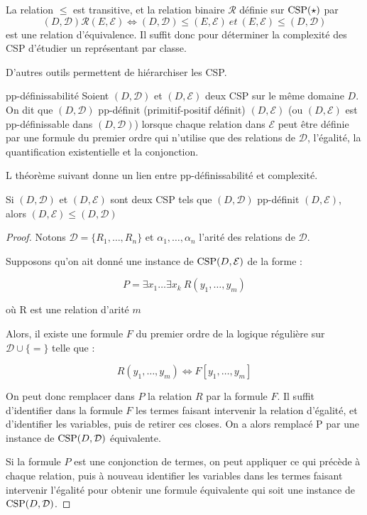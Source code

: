 \begin{prop}
La relation $\leq$ est transitive, et la relation binaire $\mathcal{R}$ définie sur $\text{CSP} (\star)$ par 
$$(D,\mathcal{D}) \mathcal{R} (E,\mathcal{E}) \iff (D,\mathcal{D}) \leq (E,\mathcal{E}) \ et \ (E,\mathcal{E}) \leq (D,\mathcal{D})$$
est une relation d'équivalence. Il suffit donc pour déterminer la complexité des CSP d'étudier un représentant par classe.
\end{prop}

D'autres outils permettent de hiérarchiser les CSP.

\begin{defi}{pp-définissabilité}
Soient $(D,\mathcal{D})$ et $(D,\mathcal{E})$ deux CSP sur le même domaine $D$. On dit que $(D,\mathcal{D})$ pp-définit (primitif-positif définit) $(D,\mathcal{E})$ (ou $(D,\mathcal{E})$ est pp-définissable dans $(D,\mathcal{D})$) lorsque chaque relation dans $\mathcal{E}$ peut être définie par une formule du premier ordre qui n'utilise que des relations de $\mathcal{D}$, l'égalité, la quantification existentielle et la conjonction.
\end{defi}

L théorème suivant donne un lien entre pp-définissabilité et complexité.

\begin{theo}{}
Si  $(D,\mathcal{D})$ et $(D,\mathcal{E})$ sont deux CSP tels que  $(D,\mathcal{D})$ pp-définit $(D,\mathcal{E})$, alors $(D,\mathcal{E}) \leq (D,\mathcal{D})$
\end{theo}

\begin{proof}
Notons $\mathcal{D} = \{R_1,\dots,R_n\}$ et $\alpha_1,\dots,\alpha_n$ l'arité des relations de $\mathcal{D}$. 

Supposons qu'on ait donné une instance de $\text{CSP} (D,\mathcal{E})$ de la forme :

$$P = \exists x_1 \dots \exists x_k \ R(y_1,\dots,y_m)$$

où R est une relation d'arité $m$

Alors, il existe une formule $F$ du premier ordre de la logique régulière sur $\mathcal{D} \cup \{=\}$ telle que :

$$ R(y_1,\dots,y_m) \iff F[y_1,\dots,y_m]$$

On peut donc remplacer dans $P$ la relation $R$ par la formule $F$. Il suffit d'identifier dans la formule $F$ les termes faisant intervenir la relation d'égalité, et d'identifier les variables, puis de retirer ces closes. On a alors remplacé P par une instance de $\text{CSP} (D,\mathcal{D})$ équivalente.

Si la formule $P$ est une conjonction de termes, on peut appliquer ce qui précède à chaque relation, puis à nouveau identifier les variables dans les termes faisant intervenir l'égalité pour obtenir une formule équivalente qui soit une instance de $\text{CSP} (D,\mathcal{D})$. 
\end{proof}


